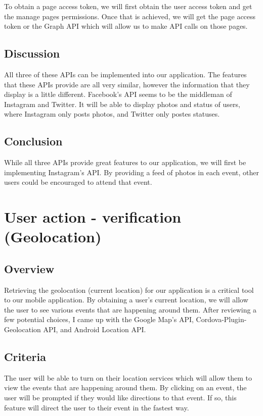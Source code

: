 \documentclass[onecolumn, draftclsnofoot,10pt, compsoc]{IEEEtran}
\begin{document}
To obtain a page access token, we will first obtain the user access token and get the manage pages permissions. Once that is achieved, we will get the page access token or the Graph API which will allow us to make API calls on those pages.\\  

\subsection{Discussion}
All three of these APIs can be implemented into our application. The features that these APIs provide are all very similar, however the information that they display is a little different. Facebook's API seems to be the middleman of Instagram and Twitter. It will be able to display photos and status of users, where Instagram only posts photos, and Twitter only postes statuses.\\ 

\subsection{Conclusion}
While all three APIs provide great features to our application, we will first be implementing Instagram's API. By providing a feed of photos in each event, other users could be encouraged to attend that event.  



\section{User action - verification (Geolocation)}
\subsection{Overview}
Retrieving the geolocation (current location) for our application is a critical tool to our mobile application. By obtaining a user's current location, we will allow the user to see various events that are happening around them. After reviewing a few potential choices, I came up with the Google Map’s API, Cordova-Plugin-Geolocation API, and Android Location API.  

\subsection{Criteria}
The user will be able to turn on their location services which will allow them to view the events that are happening around them. By clicking on an event, the user will be prompted if they would like directions to that event. If so, this feature will direct the user to their event in the fastest way. 
\end{document}
